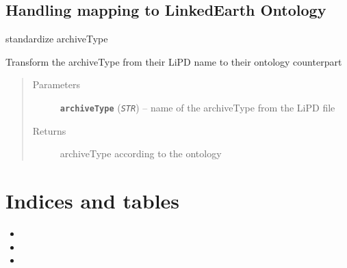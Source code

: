 \documentclass[letterpaper,10pt,english]{sphinxmanual}
\begin{document}
\section{Handling mapping to LinkedEarth Ontology}
\label{LIPDutils:handling-mapping-to-linkedearth-ontology}

\begin{fulllineitems}
\label{LIPDutils:pyleoclim.LipdToOntology}
standardize archiveType

Transform the archiveType from their LiPD name to their ontology counterpart
\begin{quote}\begin{description}
\item[{Parameters}] \leavevmode
\textbf{\texttt{archiveType}} (\emph{\texttt{STR}}) -- name of the archiveType from the LiPD file

\item[{Returns}] \leavevmode
archiveType according to the ontology

\end{description}\end{quote}

\end{fulllineitems}



\chapter{Indices and tables}
\label{index:indices-and-tables}\begin{itemize}
\item {} 

\item {} 

\item {} 

\end{itemize}



\renewcommand{\indexname}{Index}
\printindex
\end{document}
